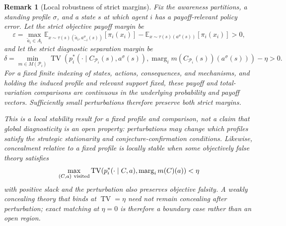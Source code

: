 \documentclass[11pt]{article}
\newtheorem{remark}[assumption]{Remark}
\theoremstyle{definition}
\newcommand{\TV}{\operatorname{TV}}
\newcommand{\marg}[1]{\operatorname{marg}_{#1}}
\begin{document}
\begin{remark}[Local robustness of strict margins]
\label{rem:local-robustness}
Fix the awareness partitions, a standing profile \(\sigma\), and a state \(s\) at which agent \(i\) has a payoff-relevant policy error.
Let the strict objective payoff margin be
\[
\varepsilon
=
\max_{\widetilde a_i\in A_i}
\mathbb E_{x\sim
\tau(s)(\widetilde a_i,a_{-i}^{\sigma}(s))}
[\pi_i(x_i)]
-
\mathbb E_{x\sim\tau(s)(a^{\sigma}(s))}
[\pi_i(x_i)]
>0,
\]
and let the strict diagnostic separation margin be
\[
\delta
=
\min_{m\in M(\mathcal P_i)}
\TV\!\left(
p_i^{*}\!\left(
\cdot\mid
C_{\mathcal P_i}(s),a^{\sigma}(s)
\right),
\marg{i}m(C_{\mathcal P_i}(s))(a^{\sigma}(s))
\right)
-\eta
>0.
\]
For a fixed finite indexing of states, actions, consequences, and mechanisms, and holding the induced profile and relevant support fixed, these payoff and total-variation comparisons are continuous in the underlying probability and payoff vectors.
Sufficiently small perturbations therefore preserve both strict margins.

This is a local stability result for a fixed profile and comparison, not a claim that global diagnosticity is an open property: perturbations may change which profiles satisfy the strategic stationarity and conjecture-confirmation conditions.
Likewise, concealment relative to a fixed profile is locally stable when some objectively false theory satisfies
\[
\max_{(C,a)\ {\rm visited}}
\TV\!\left(
p_i^{*}(\cdot\mid C,a),
\marg{i}m(C)(a)
\right)
<\eta
\]
with positive slack and the perturbation also preserves objective falsity.
A weakly concealing theory that binds at
\(\TV=\eta\) need not remain concealing after perturbation; exact matching at \(\eta=0\) is therefore a boundary case rather than an open region.
\end{remark}
\end{document}
